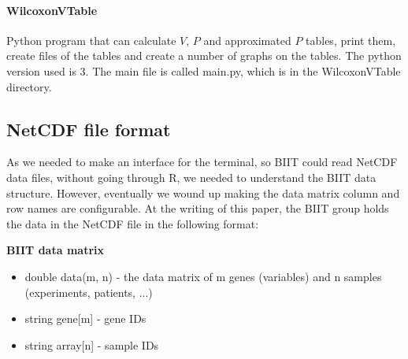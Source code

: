 \documentclass[12pt]{article}
\begin{document}
\paragraph{WilcoxonVTable}
Python program that can calculate $V$, $P$ and approximated $P$ tables, print them, create files of the tables and create a number of graphs on the tables. The python version used is 3. The main file is called main.py, which is in the WilcoxonVTable directory.

\subsection{NetCDF file format}
As we needed to make an interface for the terminal, so BIIT could read NetCDF data files, without going through R, we needed to understand the BIIT data structure. However, eventually we wound up making the data matrix column and row names are configurable.
At the writing of this paper, the BIIT group holds the data in the NetCDF file in the following format:

\textbf{BIIT data matrix}
\begin{itemize}
  \item double data(m, n) - the data matrix of m genes (variables) and n samples (experiments, patients, ...)
  \item string gene[m] - gene IDs
  \item string array[n] - sample IDs
\end{itemize}
\end{document}

